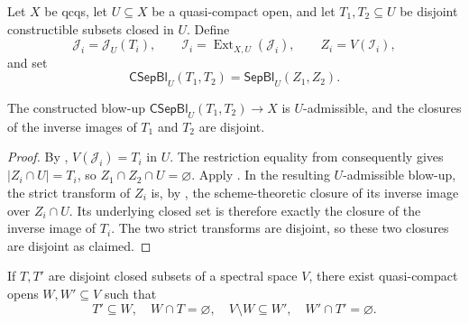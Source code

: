 \begin{definition}
  \label{def:nagata-separate-constructible-closed}

  Let $X$ be qcqs, let $U\subseteq X$ be a quasi-compact open, and let
  $T_1,T_2\subseteq U$ be disjoint constructible subsets closed in $U$.
  Define
  \[
    \mathcal J_i=\mathcal J_U(T_i),\qquad
    \mathcal I_i=\operatorname{Ext}_{X,U}(\mathcal J_i),\qquad
    Z_i=V(\mathcal I_i),
  \]
  and set
  \[
    \mathsf{CSepBl}_U(T_1,T_2)
      =\mathsf{SepBl}_U(Z_1,Z_2).
  \]
\end{definition}

\begin{lemma}
  \label{lemma:nagata-separate-constructible-closed}

  The constructed blow-up $\mathsf{CSepBl}_U(T_1,T_2)\to X$ is
  $U$-admissible, and the closures of the inverse images of $T_1$ and $T_2$
  are disjoint.
\end{lemma}

\begin{proof}
  By ,
  $V(\mathcal J_i)=T_i$ in $U$.  The restriction equality from
   consequently gives
  $|Z_i\cap U|=T_i$, so $Z_1\cap Z_2\cap U=\varnothing$.  Apply
  .  In the resulting
  $U$-admissible blow-up, the strict transform of $Z_i$ is, by
  , the
  scheme-theoretic closure of its inverse image over $Z_i\cap U$.  Its
  underlying closed set is therefore exactly the closure of the inverse image
  of $T_i$.  The two strict transforms are disjoint, so these two closures
  are disjoint as claimed.
\end{proof}

\begin{lemma}
  \label{lemma:nagata-spectral-constructible-separation-exists}

  If $T,T'$ are disjoint closed subsets of a spectral space $V$, there exist
  quasi-compact opens $W,W'\subseteq V$ such that
  \[
    T'\subseteq W,\quad W\cap T=\varnothing,\quad
    V\setminus W\subseteq W',\quad W'\cap T'=\varnothing.
  \]
\end{lemma}

